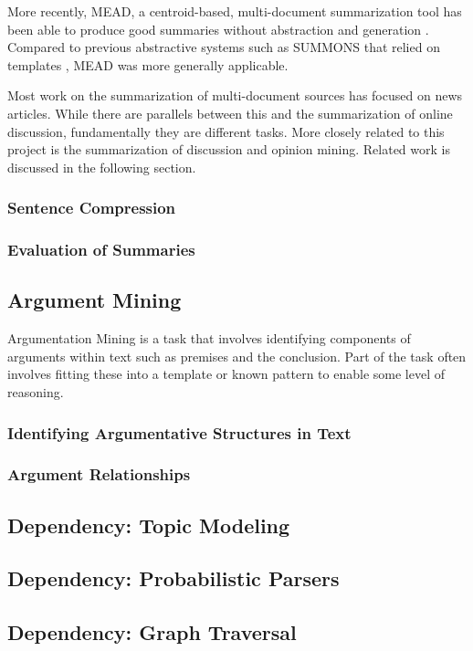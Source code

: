         More recently, MEAD, a centroid-based, multi-document summarization tool has been able to produce good summaries without abstraction and generation \cite{radev2000centroid}. Compared to previous abstractive systems such as SUMMONS that relied on templates \cite{mckeown1995generating}, MEAD was more generally applicable.

        Most work on the summarization of multi-document sources has focused on news articles. While there are parallels between this and the summarization of online discussion, fundamentally they are different tasks. More closely related to this project is the summarization of discussion and opinion mining. Related work is discussed in the following section.

      \subsubsection{Sentence Compression}
      \subsubsection{Evaluation of Summaries}

    \subsection{Argument Mining}
      Argumentation Mining is a task that involves identifying components of arguments within text such as premises and the conclusion. Part of the task often involves fitting these into a template or known pattern to enable some level of reasoning.
      \subsubsection{Identifying Argumentative Structures in Text}
      \subsubsection{Argument Relationships}
    \subsection{Dependency: Topic Modeling}
    \subsection{Dependency: Probabilistic Parsers}
    \subsection{Dependency: Graph Traversal}


